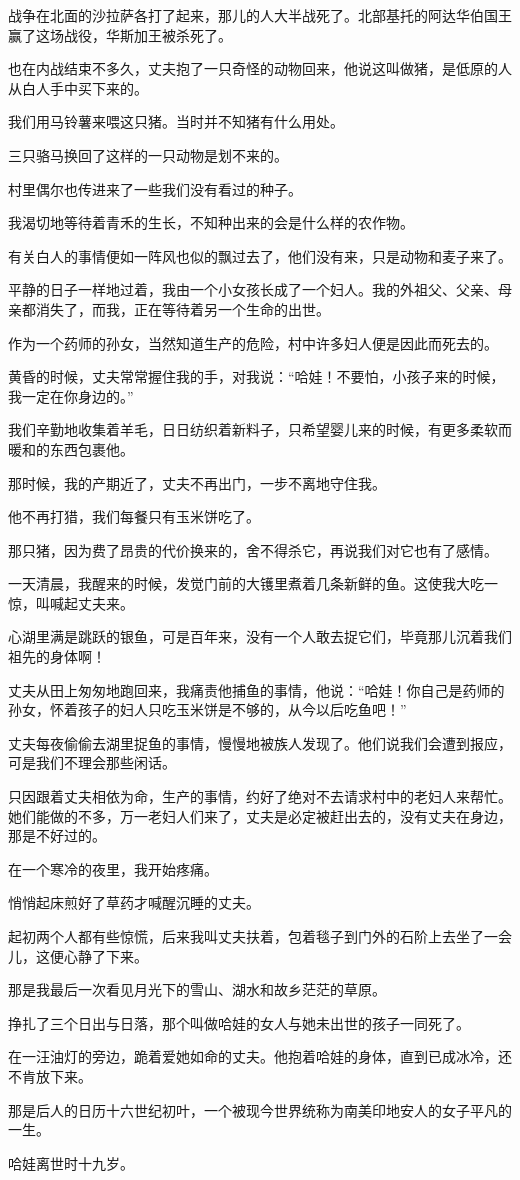 \par 战争在北面的沙拉萨各打了起来，那儿的人大半战死了。北部基托的阿达华伯国王赢了这场战役，华斯加王被杀死了。
\par 也在内战结束不多久，丈夫抱了一只奇怪的动物回来，他说这叫做猪，是低原的人从白人手中买下来的。
\par 我们用马铃薯来喂这只猪。当时并不知猪有什么用处。
\par 三只骆马换回了这样的一只动物是划不来的。
\par 村里偶尔也传进来了一些我们没有看过的种子。
\par 我渴切地等待着青禾的生长，不知种出来的会是什么样的农作物。
\par 有关白人的事情便如一阵风也似的飘过去了，他们没有来，只是动物和麦子来了。
\par 平静的日子一样地过着，我由一个小女孩长成了一个妇人。我的外祖父、父亲、母亲都消失了，而我，正在等待着另一个生命的出世。
\par 作为一个药师的孙女，当然知道生产的危险，村中许多妇人便是因此而死去的。
\par 黄昏的时候，丈夫常常握住我的手，对我说：“哈娃！不要怕，小孩子来的时候，我一定在你身边的。”
\par 我们辛勤地收集着羊毛，日日纺织着新料子，只希望婴儿来的时候，有更多柔软而暖和的东西包裹他。
\par 那时候，我的产期近了，丈夫不再出门，一步不离地守住我。
\par 他不再打猎，我们每餐只有玉米饼吃了。
\par 那只猪，因为费了昂贵的代价换来的，舍不得杀它，再说我们对它也有了感情。
\par 一天清晨，我醒来的时候，发觉门前的大镬里煮着几条新鲜的鱼。这使我大吃一惊，叫喊起丈夫来。
\par 心湖里满是跳跃的银鱼，可是百年来，没有一个人敢去捉它们，毕竟那儿沉着我们祖先的身体啊！
\par 丈夫从田上匆匆地跑回来，我痛责他捕鱼的事情，他说：“哈娃！你自己是药师的孙女，怀着孩子的妇人只吃玉米饼是不够的，从今以后吃鱼吧！”
\par 丈夫每夜偷偷去湖里捉鱼的事情，慢慢地被族人发现了。他们说我们会遭到报应，可是我们不理会那些闲话。
\par 只因跟着丈夫相依为命，生产的事情，约好了绝对不去请求村中的老妇人来帮忙。她们能做的不多，万一老妇人们来了，丈夫是必定被赶出去的，没有丈夫在身边，那是不好过的。
\par 在一个寒冷的夜里，我开始疼痛。
\par 悄悄起床煎好了草药才喊醒沉睡的丈夫。
\par 起初两个人都有些惊慌，后来我叫丈夫扶着，包着毯子到门外的石阶上去坐了一会儿，这便心静了下来。
\par 那是我最后一次看见月光下的雪山、湖水和故乡茫茫的草原。
\par 挣扎了三个日出与日落，那个叫做哈娃的女人与她未出世的孩子一同死了。
\par 在一汪油灯的旁边，跪着爱她如命的丈夫。他抱着哈娃的身体，直到已成冰冷，还不肯放下来。
\par 那是后人的日历十六世纪初叶，一个被现今世界统称为南美印地安人的女子平凡的一生。
\par 哈娃离世时十九岁。






